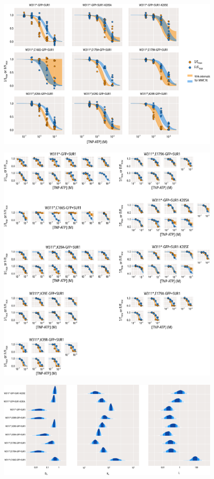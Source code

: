 \begin{figure}[h]
	\centering
	\includegraphics[width=\textwidth]{all_pcf_fits_1.pdf}
	\caption[MWC population fits]{
	}
	\label{apxfig:pcf_3}
\end{figure}

\begin{figure}[h]
	\centering
	\includegraphics[width=\textwidth]{all_pcf_fits_2.pdf}
	\caption[MWC sample fits]{
	}
	\label{apxfig:pcf_4}
\end{figure}

\begin{figure}[h]
	\centering
	\includegraphics[width=\textwidth,angle=90,origin=c]{all_pcf_params_1.pdf}
	\caption[MWC parameter posterior distributions]{
	}
	\label{apxfig:mwc_params}
\end{figure}